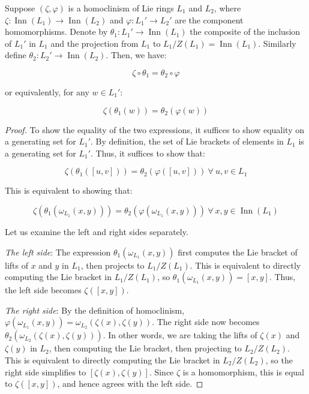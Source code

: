 \documentclass{ucetd}
\begin{document}
\begin{lemma}
  Suppose $(\zeta,\varphi)$ is a homoclinism of Lie rings $L_1$ and
  $L_2$, where $\zeta:\operatorname{Inn}(L_1) \to
  \operatorname{Inn}(L_2)$ and $\varphi:L_1' \to L_2'$ are the
  component homomorphisms. Denote by $\theta_1:L_1' \to
  \operatorname{Inn}(L_1)$ the composite of the inclusion of $L_1'$ in
  $L_1$ and the projection from $L_1$ to $L_1/Z(L_1) =
  \operatorname{Inn}(L_1)$. Similarly define $\theta_2:L_2' \to
  \operatorname{Inn}(L_2)$. Then, we have:
  
  $$\zeta \circ \theta_1 = \theta_2 \circ \varphi$$

  or equivalently, for any $w \in L_1'$:

  $$\zeta(\theta_1(w)) = \theta_2(\varphi(w))$$
\end{lemma}

\begin{proof}
  To show the equality of the two expressions, it suffices to show
  equality on a generating set for $L_1'$. By definition, the set of
  Lie brackets of elements in $L_1$ is a generating set for
  $L_1'$. Thus, it suffices to show that:

  $$\zeta(\theta_1([u,v])) = \theta_2(\varphi([u,v])) \ \forall \ u,v \in L_1$$

  This is equivalent to showing that:

  $$\zeta(\theta_1(\omega_{L_1}(x,y))) = \theta_2(\varphi(\omega_{L_1}(x,y))) \ \forall \ x,y \in \operatorname{Inn}(L_1)$$

  Let us examine the left and right sides separately. 

  {\em The left side}: The expression $\theta_1(\omega_{L_1}(x,y))$
  first computes the Lie bracket of lifts of $x$ and $y$ in $L_1$, then
  projects to $L_1/Z(L_1)$. This is equivalent to directly computing
  the Lie bracket in $L_1/Z(L_1)$, so $\theta_1(\omega_{L_1}(x,y)) =
  [x,y]$. Thus, the left side becomes $\zeta([x,y])$.

  {\em The right side}: By the definition of homoclinism,
  $\varphi(\omega_{L_1}(x,y)) = \omega_{L_2}(\zeta(x),\zeta(y))$. The
  right side now becomes
  $\theta_2(\omega_{L_2}(\zeta(x),\zeta(y)))$. In other words, we are
  taking the lifts of $\zeta(x)$ and $\zeta(y)$ in $L_2$, then
  computing the Lie bracket, then projecting to $L_2/Z(L_2)$. This is
  equivalent to directly computing the Lie bracket in $L_2/Z(L_2)$, so
  the right side simplifies to $[\zeta(x),\zeta(y)]$. Since $\zeta$ is
  a homomorphism, this is equal to $\zeta([x,y])$, and hence agrees
  with the left side.
\end{proof}
\end{document}

